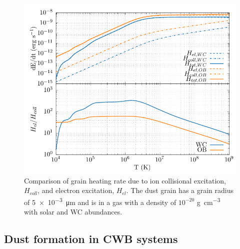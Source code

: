 \begin{figure}[h]
  \centering
  \includegraphics{assets/dust-electron-contribution/coll-el-comp.pdf}
  \caption[$H_{el}$ and $H_{coll}$ comparison]{Comparison of grain heating rate due to ion collisional excitation, $H_{coll}$, and electron excitation, $H_{el}$. The dust grain has a grain radius of \SI{5e-3}{\micro\metre} and is in a gas with a density of $10^{-20}$ \si{\gram\per\centi\metre\cubed} with solar and WC abundances.}
  \label{fig:collisionalheatingcomparison}
\end{figure}

\subsection{Dust formation in CWB systems}
\label{sec:cwbdust}

